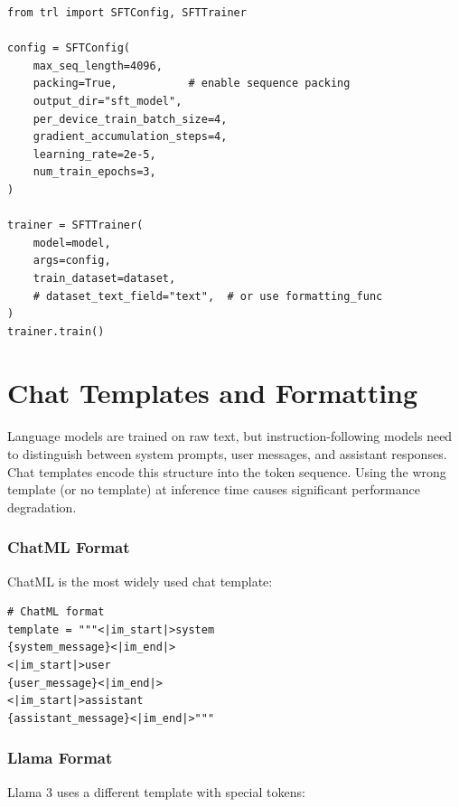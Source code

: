 \begin{examplebox}
\begin{lstlisting}[style=pythonstyle]
from trl import SFTConfig, SFTTrainer

config = SFTConfig(
    max_seq_length=4096,
    packing=True,           # enable sequence packing
    output_dir="sft_model",
    per_device_train_batch_size=4,
    gradient_accumulation_steps=4,
    learning_rate=2e-5,
    num_train_epochs=3,
)

trainer = SFTTrainer(
    model=model,
    args=config,
    train_dataset=dataset,
    # dataset_text_field="text",  # or use formatting_func
)
trainer.train()
\end{lstlisting}
\end{examplebox}

\section{Chat Templates and Formatting}
\label{sec:chat-templates}

\begin{intuitionbox}
Language models are trained on raw text, but instruction-following models need to distinguish between system prompts, user messages, and assistant responses. Chat templates encode this structure into the token sequence. Using the wrong template (or no template) at inference time causes significant performance degradation.
\end{intuitionbox}

\subsubsection*{ChatML Format}
\label{chatml-format}

ChatML is the most widely used chat template:

\begin{lstlisting}[style=pythonstyle]
# ChatML format
template = """<|im_start|>system
{system_message}<|im_end|>
<|im_start|>user
{user_message}<|im_end|>
<|im_start|>assistant
{assistant_message}<|im_end|>"""
\end{lstlisting}

\subsubsection*{Llama Format}
\label{llama-format}

Llama 3 uses a different template with special tokens:

